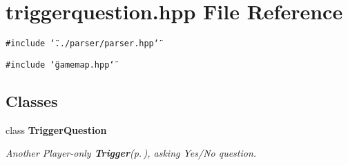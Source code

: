 \section{triggerquestion.hpp File Reference}
\label{triggerquestion_8hpp}
{\tt \#include \char`\"{}../parser/parser.hpp\char`\"{}}\par
{\tt \#include \char`\"{}gamemap.hpp\char`\"{}}\par
\subsection*{Classes}
\begin{CompactItemize}
\item 
class {\bf Trigger\-Question}
\begin{CompactList}\small\item\em Another Player-only {\bf Trigger}{\rm (p.\,\pageref{classTrigger})}, asking Yes/No question. \item\end{CompactList}\end{CompactItemize}
